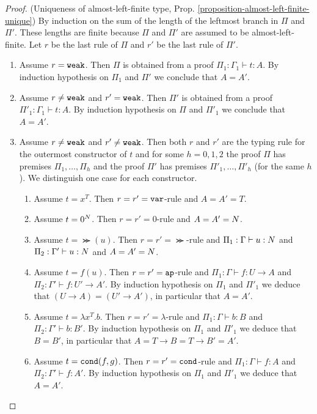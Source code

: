 \begin{proof}(Uniqueness of almost-left-finite type, Prop. \ref{proposition-almost-left-finite-unique})
By induction on the sum of the length of the leftmost branch in $\Pi$ and $\Pi'$. These lengths are finite
because $\Pi$ and $\Pi'$ are assumed to be almost-left-finite. Let $r$ be the last rule of $\Pi$ and $r'$ be the
last rule of $\Pi'$.
\begin{enumerate}
\item
Assume $r = {\tt weak}$. Then $\Pi$ is obtained from a proof $\Pi_1:\Gamma_1 \vdash t:A$. 
By induction hypothesis on $\Pi_1$ and $\Pi'$ we conclude that $A = A'$.

\item
Assume $r \not = {\tt weak}$ and $r' = {\tt weak}$. 
Then $\Pi'$ is obtained from a proof $\Pi'_1:\Gamma_1 \vdash t:A$. 
By induction hypothesis on $\Pi$ and $\Pi'_1$ we conclude that $A = A'$.

\item
Assume  $r \not = {\tt weak}$ and $r' \not = {\tt weak}$. Then both $r$ and $r'$ are the typing rule for
the outermost constructor of $t$ and for some
$h=0,1,2$ the proof $\Pi$ has premises $\Pi_1, \ldots, \Pi_h$
and the proof $\Pi'$ has premises $\Pi'_1, \ldots, \Pi'_h$ (for the same $h$). 
We distinguish one case for each constructor.

\begin{enumerate}
\item
Assume $t = x^T$. Then $r=r'={\tt var}$-rule and $A = A' = T$.

\item
Assume $t =0^{N}$. Then $r=r'=0$-rule and $A = A' = {N}$.

\item
Assume $t =\Succ(u)$. Then $r=r'=\Succ$-rule  and $\Pi_1:\Gamma \vdash u: {N}$
and $\Pi_2:\Gamma' \vdash u:{N}$ and $A = A' = {N}$.

\item
Assume $t = f(u)$. Then $r=r'={\tt ap}$-rule and $\Pi_1:\Gamma \vdash f:U \rightarrow A$
and $\Pi_2:\Gamma' \vdash f:U' \rightarrow A'$. By induction hypothesis on $\Pi_1$ and
$\Pi'_1$ we deduce that $(U \rightarrow A) = (U' \rightarrow A')$, in particular that $A = A'$.

\item
Assume $t = \lambda x^T.b$. Then $r=r'=\lambda$-rule and 
$\Pi_1:\Gamma \vdash b:B$
and $\Pi_2:\Gamma' \vdash b:B'$. By induction hypothesis on $\Pi_1$ and
$\Pi'_1$ we deduce that $B=B'$, in particular that $A = T \rightarrow B = T \rightarrow B' = A'$.

\item
Assume $t = {\tt cond}(f,g)$. Then $r=r'={\tt cond}$-rule and $\Pi_1:\Gamma \vdash f:A$
and $\Pi_2:\Gamma' \vdash f:A'$. By induction hypothesis on $\Pi_1$ and
$\Pi'_1$ we deduce that $A = A'$.

\end{enumerate}
\end{enumerate}
\end{proof}

